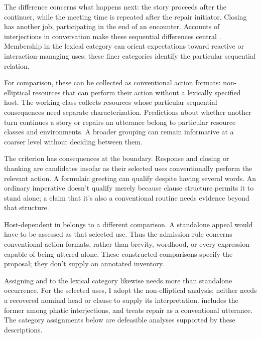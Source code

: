\documentclass[12pt]{article}
\begin{document}
The difference concerns what happens next: the story proceeds after
the continuer, while the meeting time is repeated after the repair
initiator. Closing  has another job, participating in the
end of an encounter. Accounts of interjections in conversation make
these sequential differences central \citep[257--259, 263--265]{dingemanse2024}.
Membership in the lexical category can orient expectations toward reactive
or interaction-managing uses; these finer categories identify the particular
sequential relation.

For comparison, these can be collected as conventional action formats:
non-elliptical resources that can perform their action without a lexically
specified host. The working class collects resources whose particular sequential
consequences need separate characterization. Predictions about whether
another turn continues a story or repairs an utterance belong to
particular resource classes and environments. A broader grouping can
remain informative at a coarser level without deciding between them.

The criterion has consequences at the boundary. Response 
and closing or thanking  are candidates insofar as their
selected uses conventionally perform the relevant action. A formulaic
greeting  can qualify despite having several words.
An ordinary imperative  doesn't qualify merely because
clause structure permits it to stand alone; a claim that it's also a
conventional routine needs evidence beyond that structure.

Host-dependent  in  belongs to
a different comparison. A standalone appeal  would have
to be assessed as that selected use. Thus the admission rule concerns
conventional action formats, rather than brevity, wordhood, or every
expression capable of being uttered alone. These constructed comparisons
specify the proposal; they don't supply an annotated inventory.

Assigning  and  to the lexical category
likewise needs more than standalone occurrence. For the selected uses, I
adopt the non-elliptical analysis: neither needs a recovered nominal head or
clause to supply its interpretation. \textcite[114]{ameka1992} includes the
former among phatic interjections, and \textcite[152]{wilkins1992} treats
repair  as a conventional utterance. The category assignments
below are defeasible analyses supported by these descriptions.
\end{document}
